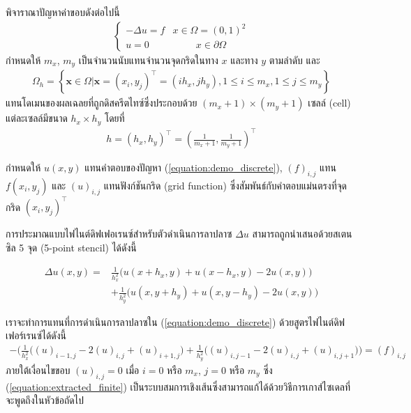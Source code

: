 \begin{Example}
    พิจาราณาปัญหาค่าขอบดังต่อไปนี้
    \begin{align}
        \left \{ \begin{array}{ll}   -\Delta u = f & x \in \Omega =	(0,1)^2	 \\
        u = 0 & \hspace{1cm} x \in \partial \Omega \end{array} \right . 
        \label{equation:demo_discrete}
    \end{align}
    \hspace{1cm} กำหนดให้ $m_x$, $m_y$ เป็นจำนวนนับแทนจำนวนจุดกริดในทาง $x$ และทาง $y$ ตามลำดับ และ
    \begin{align*}
        \Omega_{h}=\left\{ \mathbf{x} \in \Omega | \mathbf{x}=(x_i,y_j)^{\top} = (ih_x,jh_y), 1 \leq i \leq m_x, 1 \leq j \leq m_y  \right\}
    \end{align*}
    แทนโดเมนของผลเฉลยที่ถูกดิสครีตไทซ์ซึ่งประกอบด้วย $(m_x+1) \times (m_y+1)$ เซลล์ (cell) แต่ละเซลล์มีขนาด $h_x \times h_y$ โดยที่
    \begin{align*}
        h = (h_x,h_y)^{\top} = (\frac{1}{m_x+1},\frac{1}{m_y+1})^{\top}
    \end{align*}

    \hspace{1cm} กำหนดให้ $u(x,y)$ แทนคำตอบของปัญหา (\ref{equation:demo_discrete}), $(f)_{i,j}$ แทน $f(x_i,y_j)$ และ $(u)_{i,j}$ แทนฟังก์ชันกริด (grid function) ซึ่งสัมพันธ์กับคำตอบแม่นตรงที่จุดกริด $(x_i,y_j)^{\top}$ 
    
    \hspace{1cm} การประมาณแบบไฟไนต์ดิฟเฟอเรนซ์สำหรับตัวดำเนินการลาปลาซ $\Delta u$ สามารถถูกนำเสนอด้วยสเตนซิล 5 จุด (5-point stencil) ได้ดังนี้

    \begin{align}
        \nonumber \Delta u(x,y) = &\frac{1}{h_x^2} \Big( u(x+h_x,y) + u(x-h_x,y) - 2 u(x,y) \Big) \\&+ \frac{1}{h_y^2} \Big( u(x,y+h_y) + u(x,y-h_y) - 2 u(x,y) \Big) 
        \label{equation:5point-stencil}
    \end{align}

    เราจะทำการแทนที่การดำเนินการลาปลาซใน  (\ref{equation:demo_discrete}) ด้วยสูตรไฟไนต์ดิฟเฟอร์เรนซ์ได้ดังนี้
    \begin{align}
        - \Big( \frac{1}{h_x^2} \big( (u)_{i-1,j} - 2(u)_{i,j} + (u)_{i+1,j}\big) + \frac{1}{h_y^2} \big( (u)_{i,j-1} - 2(u)_{i,j} + (u)_{i,j+1}\big) \Big) = (f)_{i,j}
        \label{equation:extracted_finite}
    \end{align}
    ภายใต้เงื่อนไขขอบ $(u)_{i,j} = 0$ เมื่อ $i = 0$ หรือ $m_x$, $j = 0$ หรือ $m_y$ ซึ่ง (\ref{equation:extracted_finite}) เป็นระบบสมการเชิงเส้นซึ่งสามารถแก้ได้ด้วยวิธีการเกาส์ไซเดลที่จะพูดถึงในหัวข้อถัดไป
\end{Example}